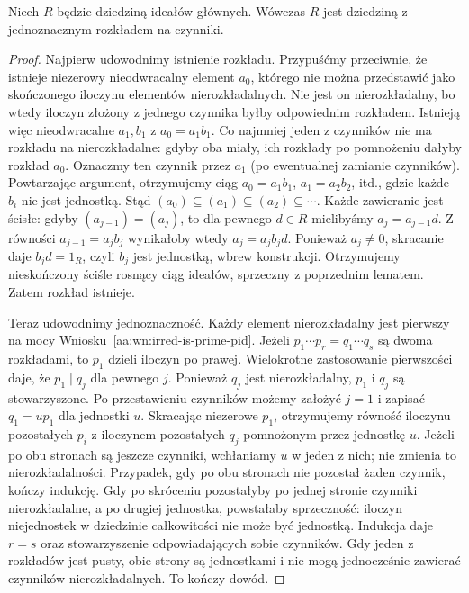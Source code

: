 \begin{twierdzenie}
\label{aa:tw:pid-ufd}
Niech $R$ będzie dziedziną ideałów głównych.
Wówczas $R$ jest dziedziną z jednoznacznym rozkładem
na czynniki.
\end{twierdzenie}
\begin{proof}
Najpierw udowodnimy istnienie rozkładu.
Przypuśćmy przeciwnie, że istnieje niezerowy nieodwracalny
element $a_0$, którego nie można przedstawić jako skończonego
iloczynu elementów nierozkładalnych. Nie jest on nierozkładalny,
bo wtedy iloczyn złożony z jednego czynnika byłby odpowiednim
rozkładem. Istnieją więc nieodwracalne $a_1,b_1$ z
$a_0=a_1b_1$. Co najmniej jeden z czynników nie ma rozkładu
na nierozkładalne: gdyby oba miały, ich rozkłady po pomnożeniu
dałyby rozkład $a_0$. Oznaczmy ten czynnik przez $a_1$
(po ewentualnej zamianie czynników).
Powtarzając argument, otrzymujemy ciąg
$a_0=a_1b_1$, $a_1=a_2b_2$, itd.,
gdzie każde $b_i$ nie jest jednostką. Stąd
$(a_0)\subseteq(a_1)\subseteq(a_2)\subseteq\cdots$.
Każde zawieranie jest ścisłe: gdyby $(a_{j-1})=(a_j)$,
to dla pewnego $d\in R$ mielibyśmy $a_j=a_{j-1}d$.
Z równości $a_{j-1}=a_jb_j$ wynikałoby wtedy
$a_j=a_jb_jd$. Ponieważ $a_j\ne0$, skracanie daje
$b_jd=1_R$, czyli $b_j$ jest jednostką, wbrew konstrukcji.
Otrzymujemy nieskończony ściśle rosnący ciąg ideałów,
sprzeczny z poprzednim lematem. Zatem rozkład istnieje.

Teraz udowodnimy jednoznaczność. Każdy element nierozkładalny
jest pierwszy na mocy Wniosku~\ref{aa:wn:irred-is-prime-pid}.
Jeżeli $p_1\cdots p_r=q_1\cdots q_s$ są dwoma rozkładami,
to $p_1$ dzieli iloczyn po prawej. Wielokrotne zastosowanie
pierwszości daje, że $p_1\mid q_j$ dla pewnego $j$.
Ponieważ $q_j$ jest nierozkładalny, $p_1$ i $q_j$
są stowarzyszone. Po przestawieniu czynników możemy
założyć $j=1$ i zapisać $q_1=up_1$ dla jednostki $u$.
Skracając niezerowe $p_1$, otrzymujemy równość iloczynu
pozostałych $p_i$ z iloczynem pozostałych $q_j$ pomnożonym
przez jednostkę $u$. Jeżeli po obu stronach są jeszcze czynniki,
wchłaniamy $u$ w jeden z nich; nie zmienia to nierozkładalności.
Przypadek, gdy po obu stronach nie pozostał żaden czynnik,
kończy indukcję. Gdy po skróceniu pozostałyby
po jednej stronie czynniki nierozkładalne, a po drugiej
jednostka, powstałaby sprzeczność: iloczyn niejednostek
w dziedzinie całkowitości nie może być jednostką.
Indukcja daje $r=s$ oraz stowarzyszenie odpowiadających sobie
czynników. Gdy jeden z rozkładów jest pusty, obie strony
są jednostkami i nie mogą jednocześnie zawierać czynników
nierozkładalnych. To kończy dowód.
\end{proof}

